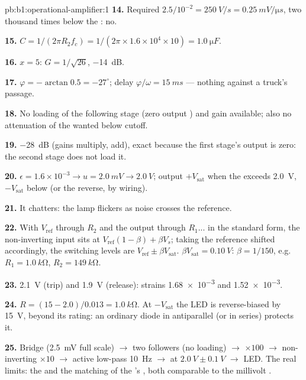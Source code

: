 \begin{solution}{pb:b1:operational-amplifier:1}
\textbf{14.} Required $2.5/10^{-2} = \qty{250}{V/s} = \qty{0.25}{mV/\micro s}$,
two thousand times below the : no.

\textbf{15.} $C = 1/(2\pi R_2f_c) = 1/(2\pi \times 1.6\times10^4 \times 10)
= \qty{1.0}{\micro F}$.

\textbf{16.} $x = 5$: $G = 1/\sqrt{26}$, \qty{-14}{dB}.

\textbf{17.} $\varphi = -\arctan 0.5 = -27^\circ$; delay $\varphi/\omega =
\qty{15}{ms}$ --- nothing against a truck's passage.

\textbf{18.} No loading of the following stage (zero output )
and gain available; also no attenuation of the wanted  below
cutoff.

\textbf{19.} \qty{-28}{dB} (gains multiply,  add), exact because
the first stage's output  is zero: the second stage does not
load it.

\textbf{20.} $\epsilon = 1.6\times10^{-3} \to u = \qty{2.0}{mV} \to
\qty{2.0}{V}$; output $+V_{\mathrm{sat}}$ when the  exceeds
\qty{2.0}{V}, $-V_{\mathrm{sat}}$ below (or the reverse, by wiring).

\textbf{21.} It chatters: the lamp flickers as noise crosses the
reference.

\textbf{22.} With $V_{\mathrm{ref}}$ through $R_2$ and the output through
$R_1$... in the standard form, the non-inverting input sits at
$V_{\mathrm{ref}}(1 - \beta) + \beta V_s$; taking the reference shifted
accordingly, the switching levels are $V_{\mathrm{ref}} \pm \beta V_{\mathrm{sat}}$.
$\beta V_{\mathrm{sat}} = \qty{0.10}{V}$: $\beta = 1/150$, e.g.\ $R_1 =
\qty{1.0}{k\ohm}$, $R_2 = \qty{149}{k\ohm}$.

\textbf{23.} \qty{2.1}{V} (trip) and \qty{1.9}{V} (release): strains
\num{1.68e-3} and \num{1.52e-3}.

\textbf{24.} $R = (15 - 2.0)/0.013 = \qty{1.0}{k\ohm}$. At
$-V_{\mathrm{sat}}$ the LED is reverse-biased by \qty{15}{V}, beyond its
rating: an ordinary diode in antiparallel (or in series) protects it.

\textbf{25.} Bridge (\qty{2.5}{mV} full scale) $\to$ two followers (no
loading) $\to$  $\times100$ $\to$ non-inverting
$\times10$ $\to$ active low-pass \qty{10}{Hz} $\to$  at
$\qty{2.0}{V} \pm \qty{0.1}{V}$ $\to$ LED. The real limits: the  and the matching of the 's
, both comparable to the millivolt .
\end{solution}
